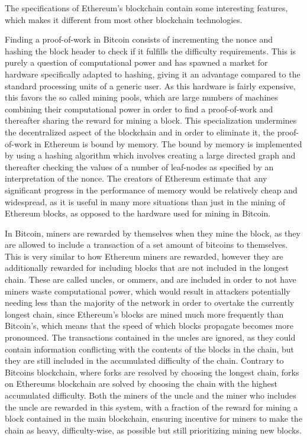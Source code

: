 \documentclass{article}
\begin{document}
		The specifications of Ethereum's blockchain\cite{yellow-paper, ethereum-white-paper} contain some interesting features, which makes it different from most other blockchain technologies.
		
		Finding a proof-of-work in Bitcoin consists of incrementing the nonce and hashing the block header to check if it fulfills the difficulty requirements. 
		This is purely a question of computational power and has spawned a market for hardware specifically adapted to hashing, giving it an advantage compared to the standard processing units of a generic user. 
		As this hardware is fairly expensive, this favors the so called mining pools, which are large numbers of machines combining their computational power in order to find a proof-of-work and thereafter sharing the reward for mining a block. 
		This specialization undermines the decentralized aspect of the blockchain and in order to eliminate it, the proof-of-work in Ethereum is bound by memory.
		The bound by memory is implemented by using a hashing algorithm which involves creating a large directed graph and thereafter checking the values of a number of leaf-nodes as specified by an interpretation of the nonce. 
		The creators of Ethereum estimate that any significant progress in the performance of memory would be relatively cheap and widespread, as it is useful in many more situations than just in the mining of Ethereum blocks, as opposed to the hardware used for mining in Bitcoin.

		In Bitcoin, miners are rewarded by themselves when they mine the block, as they are allowed to include a transaction of a set amount of bitcoins to themselves.
		This is very similar to how Ethereum miners are rewarded, however they are additionally rewarded for including blocks that are not included in the longest chain.
		These are called uncles, or ommers, and are included in order to not have miners waste computational power, which would result in attackers potentially needing less than the majority of the network in order to overtake the currently longest chain, since Ethereum's blocks are mined much more frequently than Bitcoin's, which means that the speed of which blocks propagate becomes more pronounced. 
		The transactions contained in the uncles are ignored, as they could contain information conflicting with the contents of the blocks in the chain, but they are still included in the accumulated difficulty of the chain. Contrary to Bitcoins blockchain, where forks are resolved by choosing the longest chain, forks on Ethereums blockchain are solved by choosing the chain with the highest accumulated difficulty.
		Both the miners of the uncle and the miner who includes the uncle are rewarded in this system, with a fraction of the reward for mining a block contained in the main blockchain, ensuring incentive for miners to make the chain as heavy, difficulty-wise, as possible but still prioritizing mining new blocks.
\end{document}
